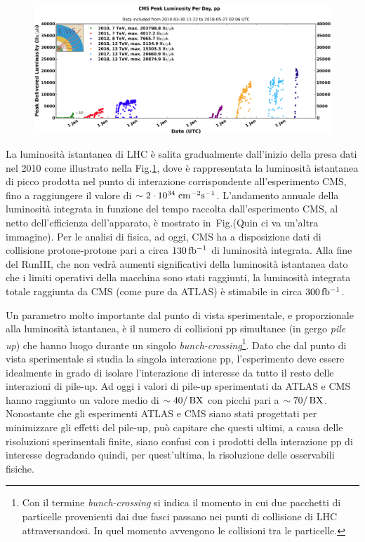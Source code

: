 \begin{figure}
\centering
\includegraphics[width=\textwidth]{Immagini/peak_lumi_ppbis}
\caption{ }
\label{peak_lumi_pp}
\end{figure}
La luminosit\`a istantanea di LHC \`e salita gradualmente dall'inizio della presa dati nel 2010 come illustrato nella Fig.\ref{peak_lumi_pp},
 dove \`e rappresentata la luminosit\`a istantanea di picco prodotta nel punto di interazione corrispondente all'esperimento CMS, fino a raggiungere il valore di $\sim 2\cdot10^{34}\rm \; cm^{-2}{\mathrm s}^{-1}$. L'andamento annuale della luminosit\`a integrata in funzione del tempo raccolta dall'esperimento CMS, al netto dell'efficienza dell'apparato, \`e mostrato in~Fig.(Quin ci va un'altra immagine). Per le analisi di fisica, ad oggi, CMS ha a disposizione dati di collisione protone-protone pari a circa $130{\rm \, fb^{-1}}$ di luminosit\`a integrata. Alla fine del RunIII, che non vedr\`a aumenti significativi della luminosit\`a istantanea dato che i limiti operativi della macchina sono stati raggiunti, la luminosit\`a integrata totale raggiunta da CMS (come pure da ATLAS) \`e stimabile in circa $300{\rm \, fb^{-1}}$.

Un parametro molto importante dal punto di vista sperimentale, e proporzionale alla luminosit\`a istantanea, \`e il numero di collisioni pp simultanee (in gergo {\em pile up}) che hanno luogo durante un singolo \textit{bunch-crossing}\footnote{Con il termine \textit{bunch-crossing} si indica il momento in cui due pacchetti di particelle provenienti dai due fasci passano nei punti di collisione di LHC attraversandosi. In quel momento avvengono le collisioni tra le particelle.}. Dato che dal punto di vista sperimentale si studia la singola interazione pp, l'esperimento deve essere idealmente in grado di isolare l'interazione di interesse da tutto il resto delle interazioni di pile-up. Ad oggi i valori di pile-up sperimentati da ATLAS e CMS hanno raggiunto un valore medio di $\sim 40/\rm \, BX$ con picchi pari a $\sim 70/\rm \, BX$. Nonostante che gli esperimenti ATLAS e CMS siano stati progettati per minimizzare gli effetti del pile-up, può capitare che questi ultimi, a causa delle risoluzioni sperimentali finite, siano confusi con i prodotti della interazione pp di interesse degradando quindi, per quest'ultima, la risoluzione delle osservabili fisiche.



